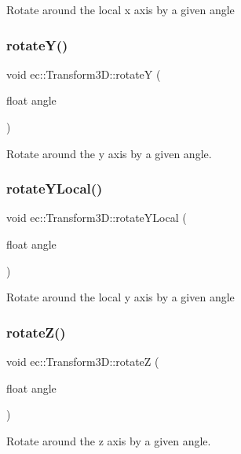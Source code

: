Rotate around the local x axis by a given angle \mbox{\label{classec_1_1_transform3_d_a3e365a26befa6aabeb2e0b3ca680dd4f}} 
\subsubsection{\texorpdfstring{rotate\+Y()}{rotateY()}}
{\footnotesize\ttfamily void ec\+::\+Transform3\+D\+::rotateY (\begin{DoxyParamCaption}\item[{float}]{angle }\end{DoxyParamCaption})}

Rotate around the y axis by a given angle. \mbox{\label{classec_1_1_transform3_d_abfc79987e5fc4c805c5ff479d2c8b624}} 
\subsubsection{\texorpdfstring{rotate\+Y\+Local()}{rotateYLocal()}}
{\footnotesize\ttfamily void ec\+::\+Transform3\+D\+::rotate\+Y\+Local (\begin{DoxyParamCaption}\item[{float}]{angle }\end{DoxyParamCaption})}

Rotate around the local y axis by a given angle \mbox{\label{classec_1_1_transform3_d_afb339cf9f8c44fa6db954eb82af63c5b}} 
\subsubsection{\texorpdfstring{rotate\+Z()}{rotateZ()}}
{\footnotesize\ttfamily void ec\+::\+Transform3\+D\+::rotateZ (\begin{DoxyParamCaption}\item[{float}]{angle }\end{DoxyParamCaption})}

Rotate around the z axis by a given angle. \mbox{\label{classec_1_1_transform3_d_a9079ea3fc1c171f2e70fb489c804fc52}} 
